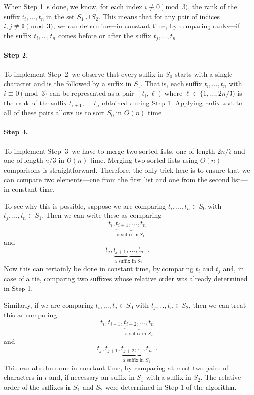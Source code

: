 When Step 1 is done, we know, for each index $i\not\equiv 0\pmod 3$,
the rank of the suffix $t_i,\ldots,t_n$ in the set $S_1\cup S_2$.
This means that for any pair of indices $i,j\not\equiv 0\pmod 3$, we
can determine---in constant time, by comparing ranks---if the suffix
$t_i,\ldots,t_n$ comes before or after the suffix $t_j,\ldots,t_n$.

\paragraph{Step 2.}
To implement Step~2, we observe that every suffix in $S_0$ starts with
a single character and is the followed by a suffix in $S_1$.  That is,
each suffix $t_i,\ldots,t_n$ with $i\equiv 0\pmod 3$ can be represented
as a pair $(t_i,\ell)$ where $\ell\in\{1,\ldots,2n/3)$ is the rank of
the suffix $t_{i+1},\ldots,t_n$ obtained during Step 1.  Applying radix
sort to all of these pairs allows us to sort $S_0$ in $O(n)$ time.

\paragraph{Step 3.}
To implement Step~3, we have to merge two sorted lists, one of length $2n/3$ and one of length $n/3$ in $O(n)$ time.  Merging two sorted lists using $O(n)$ comparisons is straightforward. Therefore, the only trick here is to ensure that we can compare two elements---one from the first list and one from the second list---in constant time.

To see why this is possible, suppose we are comparing $t_i,\ldots,t_n\in S_0$ with $t_j,\ldots,t_n\in S_1$.  Then we can write these as comparing
\[
   t_i,\underbrace{t_{i+1},\ldots,t_n}_{\text{a suffix in $S_1$}}
\]
and
\[
   t_j,\underbrace{t_{j+1},\ldots,t_n}_{\text{a suffix in $S_2$}}
    \enspace .
\]
Now this can certainly be done in constant time, by comparing $t_i$ and $t_j$ and, in case of a tie, comparing two suffixes whose relative order was already determined in Step 1.

Similarly, if we are comparing
$t_i,\ldots,t_n\in S_0$ with $t_j,\ldots,t_n\in S_2$, then we can treat this as comparing
\[
   t_i,t_{i+1},\underbrace{t_{i+2},\ldots,t_n}_{\text{a suffix in $S_2$}}
\]
and
\[
   t_j,t_{j+1},\underbrace{t_{j+2},\ldots,t_n}_{\text{a suffix in $S_1$}}
    \enspace .
\]
This can also be done in constant time, by comparing at most two
pairs of characters in $t$ and, if necessary an suffix in $S_1$ with a suffix
in $S_2$.  The relative order of the suffixes in $S_1$ and $S_2$ were determined in Step 1 of the algorithm.

